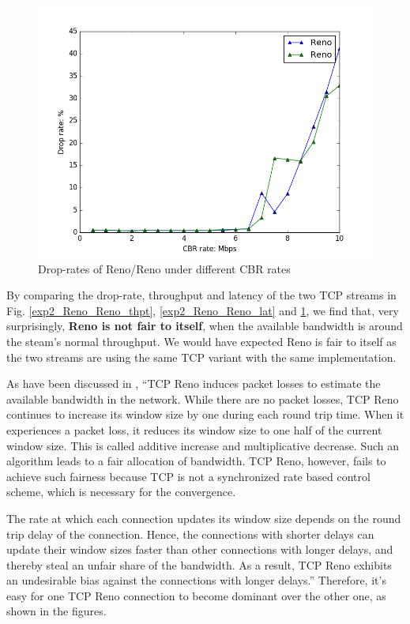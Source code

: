 \documentclass[10pt, conference]{IEEEtran/IEEEtran}
\begin{document}
\begin{figure}[!ht]
\begin{center}
\includegraphics[width=\linewidth]{../exp2/exp2_Reno_Reno_drop.png}
\caption{Drop-rates of Reno/Reno under different CBR rates}
\label{exp2_Reno_Reno_drop}
\end{center}
\end{figure}


By comparing the drop-rate, throughput and latency of the two TCP streams in Fig. \ref{exp2_Reno_Reno_thpt}, \ref{exp2_Reno_Reno_lat} and \ref{exp2_Reno_Reno_drop}, we find that, very surprisingly, \textbf{Reno is not fair to itself}, when the available bandwidth is around the steam's normal throughput. We would have expected Reno is fair to itself as the two streams are using the same TCP variant with the same implementation. 

As have been discussed in \cite{reno}, ``TCP Reno induces packet losses to estimate the available bandwidth in the network. While there
are no packet losses, TCP Reno continues to increase its window size by one during each round
trip time. When it experiences a packet loss, it reduces its window size to one half of the current
window size. This is called additive increase and multiplicative decrease. Such
an algorithm leads to a fair allocation of bandwidth. TCP Reno, however, fails to achieve such
fairness because TCP is not a synchronized rate based control scheme, which is necessary for the
convergence.

The rate at which each connection updates its window size depends on the round trip delay of
the connection. Hence, the connections with shorter delays can update their window sizes faster
than other connections with longer delays, and thereby steal an unfair share of the bandwidth. As
a result, TCP Reno exhibits an undesirable bias against the connections with longer delays.'' Therefore, it's easy for one TCP Reno connection to become dominant over the other one, as shown in the figures.
\end{document}
